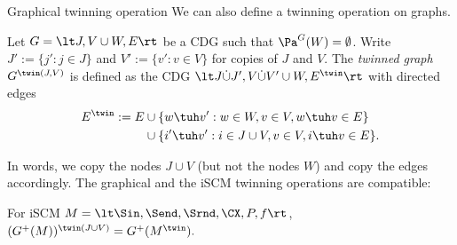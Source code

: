 \begin{frame}{Graphical twinning operation}
We can also define a twinning operation on graphs.
\begin{Def}[\ref{def:G_twinning}]
  Let $G=\lt J,V \cup W,E\rt$ be a CDG such that $\Pa^G(W) = \emptyset$. Write $J' := \{j' : j \in J\}$
  and $V' := \{v' : v \in V\}$ for copies of $J$ and $V$.
  The \emph{twinned graph
  $G^{\twin(J,V)}$} is defined as the CDG $\lt J \dot\cup J', V \dot\cup V' \cup W, E^\twin\rt$ with directed edges
  \begin{equation*}\begin{split}
    E^\twin := E & \cup \{w \tuh v' : w \in W, v \in V, w \tuh v \in E\}\\
                 & \cup \{i' \tuh v' : i \in J \cup V, v \in V, i \tuh v \in E\}.
  \end{split}\end{equation*}
\end{Def}
In words, we copy the nodes $J \cup V$ (but not the nodes $W$) and copy the edges accordingly.
The graphical and the iSCM twinning operations are compatible:
\begin{Prp}[\ref{prp:compatibility_graph_twinning}]
  For iSCM $M = \lt \Sin, \Send, \Srnd, \CX, P, f \rt$, $(G^+(M))^{\twin(J\cup V)} = G^+(M^\twin).$
\end{Prp}
\end{frame}

